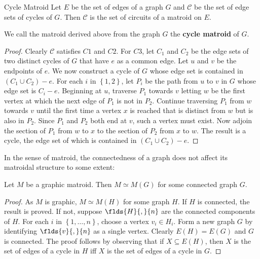\documentclass[a4paper,10pt]{article}
\renewcommand{\vocab}[1]{\textbf{#1}}
\newcommand{\CC}{\mathcal{C}}
\begin{document}
\begin{proposition}[pps:]{Cycle Matroid}
  Let $E$ be the set of edges of a graph $G$ and $\CC$ be the set of edge sets of cycles of $G$. Then $\CC$ is the set of circuits of a matroid on $E$.
  \begin{remark}
    We call the matroid derived above from the graph $G$ the \vocab{cycle matroid} of $G$. 
  \end{remark}
  \begin{proof}
    Clearly $\CC$ satisfies $C1$ and $C2$. For $C3$, let $C_1$ and $C_2$ be the edge sets of two distinct cycles of $G$ that have $e$ as a common edge. Let $u$ and $v$ be the endpoints of $e$. We now construct a cycle of $G$ whose edge set is contained in $(C_1\cup C_2)-e$. For each $i$ in $\left\{1,2\right\}$, let $P_i$ be the path from $u$ to $v$ in $G$ whose edge set is $C_i-e$. Beginning at $u$, traverse $P_1$ towards $v$ letting $w$ be the first vertex at which the next edge of $P_1$ is not in $P_2$. Continue traversing $P_1$ from $w$ towards $v$ until the first time a vertex $x$ is reached that is distinct from $w$ but is also in $P_2$. Since $P_1$ and $P_2$ both end at $v$, such a vertex must exist. Now adjoin the section of $P_1$ from $w$ to $x$ to the section of $P_2$ from $x$ to $w$. The result is a cycle, the edge set of which is contained in $(C_1\cup C_2)-e$. 
  \end{proof}
\end{proposition}

In the sense of matroid, the connectedness of a graph does not affect its matroidal structure to some extent:

\begin{proposition}[pps:]{}
  Let $M$ be a graphic matroid. Then $M\simeq M(G)$ for some connected graph $G$.
  \begin{proof}
    As $M$ is graphic, $M\simeq M(H)$ for some graph $H$. If $H$ is connected, the result is proved. If not, suppose $\flds{H}{,}{n}$ are the connected components of $H$. For each $i$ in $\left\{1,\dots ,n\right\}$, choose a vertex $v_i\in H_i$. Form a new graph $G$ by identifying $\flds{v}{,}{n}$ as a single vertex. Clearly $E(H)=E(G)$ and $G$ is connected. The proof follows by observing that if $X\subseteq E(H)$, then $X$ is the set of edges of a cycle in $H$ iff $X$ is the set of edges of a cycle in $G$. 
  \end{proof}
\end{proposition}

\newpage
{}
\end{document}

